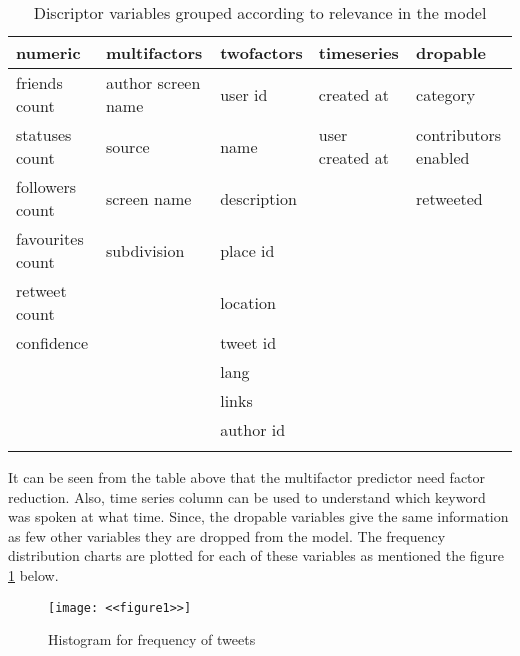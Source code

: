 \documentclass[a4paper,12pt, notitlepage]{article}
\begin{document}
\begin{table}[!htbp]
\centering
\begin{tabular}{ |l|l|l|l|l| }
\hline \rowcolor{Gray}
numeric	 & 	multifactors & twofactors & timeseries & dropable \\[1ex]
\hline
friends count    & author screen name & user id     & created at          & category \\[1ex]
statuses count   & source           & name      & user created at & contributors enabled\\[1ex]
followers count  & screen name        & description &             & retweeted \\[1ex]
favourites count & subdivision        & place id    &             &        \\[1ex]
retweet count    &                    & location    &             &        \\[1ex]
confidence       &                    & tweet id    &             &        \\[1ex]
                 &                    & lang        &             &        \\[1ex]
                 &                    & links       &             &        \\[1ex]
                 &                    & author id   &             &        \\[1ex]
                 &                    &             &             &        \\[1ex]
\hline
\end{tabular}
\caption{Discriptor variables grouped according to relevance in the model}
\label{table:3}
\end{table}

\par
It can be seen from the table above that the multifactor predictor need factor reduction. Also, time series column can be used to understand which keyword was spoken at what time. Since, the dropable variables give the same information as few other variables they are dropped from the model. The frequency distribution charts are plotted for each of these variables as mentioned the figure \ref{fig:hist1} below.

\begin{figure}[!htbp]
    \centering
    \texttt{[image: <<figure1>>]}
    \caption{Histogram for frequency of tweets}
    \label{fig:hist1}
\end{figure}
\end{document}
